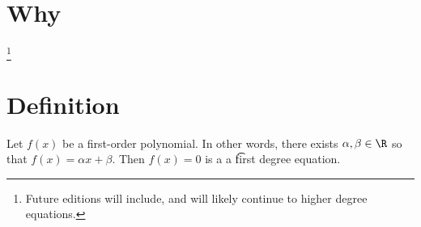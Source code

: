 
\section*{Why}
\footnote{Future editions will include, and will likely continue to higher degree equations.}
\section*{Definition}

Let $f(x)$ be a first-order polynomial.
In other words, there exists $\alpha , \beta  \in \R $ so that $f(x) = \alpha  x + \beta $.
Then $f(x) = 0$ is a a \t{first degree equation}.

\blankpage
